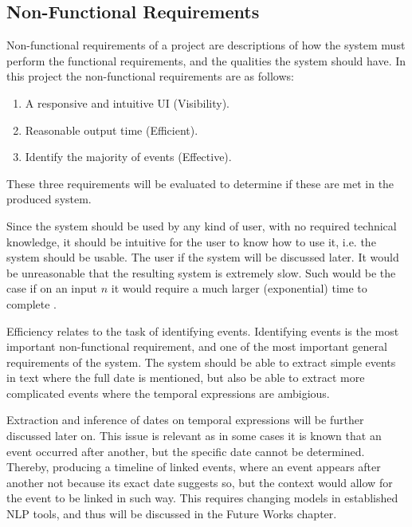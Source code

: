 \subsection{Non-Functional Requirements}
\par Non-functional requirements of a project are descriptions of how the system must perform the functional requirements, and the qualities the system should have. In this project the non-functional requirements are as follows:
\begin{enumerate}
\item A responsive and intuitive UI (Visibility).
\item Reasonable output time (Efficient).
\item Identify the majority of events (Effective).
\end{enumerate}
\par These three requirements will be evaluated to determine if these are met in the produced system. 
\par Since the system should be used by any kind of user, with no required technical knowledge, it should be intuitive for the user to know how to use it, i.e. the system should be usable. The user if the system will be discussed later. It would be unreasonable that the resulting system is extremely slow. Such would be the case if on an input $n$ it would require a much larger (exponential) time to complete . 
\par Efficiency relates to the task of identifying events. Identifying events is the most important non-functional requirement, and one of the most important general requirements of the system. The system should be able to extract simple events in text where the full date is mentioned, but also be able to extract more complicated events where the temporal expressions are ambigious. 
\par Extraction and inference of dates on temporal expressions will be further discussed later on. This issue is relevant as in some cases it is known that an event occurred after another, but the specific date cannot be determined. Thereby, producing a timeline of linked events, where an event appears after another not because its exact date suggests so, but the context would allow for the event to be linked in such way. This requires changing models in  established NLP tools, and thus will be discussed in the Future Works chapter.

